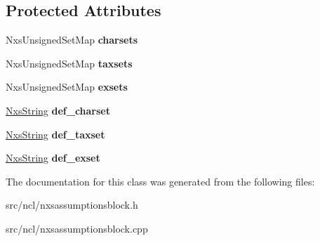 \subsection*{Protected Attributes}
\begin{DoxyCompactItemize}
\item 
\hypertarget{classNxsAssumptionsBlock_a508e1de60779c879b745e302f9362710}{
NxsUnsignedSetMap {\bfseries charsets}}
\label{classNxsAssumptionsBlock_a508e1de60779c879b745e302f9362710}

\item 
\hypertarget{classNxsAssumptionsBlock_a7198495563281db0873eb073a27f70c4}{
NxsUnsignedSetMap {\bfseries taxsets}}
\label{classNxsAssumptionsBlock_a7198495563281db0873eb073a27f70c4}

\item 
\hypertarget{classNxsAssumptionsBlock_a1fc9a777dac58b15cbdfc612252a19e2}{
NxsUnsignedSetMap {\bfseries exsets}}
\label{classNxsAssumptionsBlock_a1fc9a777dac58b15cbdfc612252a19e2}

\item 
\hypertarget{classNxsAssumptionsBlock_ad5f1746eda7c3d382bfc11369a1b99c3}{
\hyperlink{classNxsString}{NxsString} {\bfseries def\_\-charset}}
\label{classNxsAssumptionsBlock_ad5f1746eda7c3d382bfc11369a1b99c3}

\item 
\hypertarget{classNxsAssumptionsBlock_a26ed61ddb7521a28f84664ffe5fb16db}{
\hyperlink{classNxsString}{NxsString} {\bfseries def\_\-taxset}}
\label{classNxsAssumptionsBlock_a26ed61ddb7521a28f84664ffe5fb16db}

\item 
\hypertarget{classNxsAssumptionsBlock_a1879c7387e60556615468c778f7b3dc9}{
\hyperlink{classNxsString}{NxsString} {\bfseries def\_\-exset}}
\label{classNxsAssumptionsBlock_a1879c7387e60556615468c778f7b3dc9}

\end{DoxyCompactItemize}


The documentation for this class was generated from the following files:\begin{DoxyCompactItemize}
\item 
src/ncl/nxsassumptionsblock.h\item 
src/ncl/nxsassumptionsblock.cpp\end{DoxyCompactItemize}
